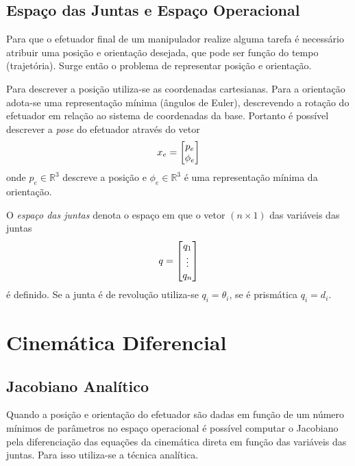 \subsection{Espaço das Juntas e Espaço Operacional}
Para que o efetuador final de um manipulador realize alguma tarefa é necessário atribuir uma posição e orientação desejada, que  pode ser função do tempo (trajetória). Surge então o problema de representar posição e orientação. 

Para descrever a posição utiliza-se as coordenadas cartesianas. Para a orientação adota-se uma representação mínima (ângulos de Euler), descrevendo a rotação do efetuador em relação ao sistema de coordenadas da base. Portanto é possível descrever a \textit{pose} do efetuador através do vetor
\begin{equation} \label{eq:op_space}
{x}_e = \begin{bmatrix} {p}_e \\ {\phi}_e\end{bmatrix}
\end{equation}
onde ${p}_e \in \mathbb{R}^3$ descreve a posição e ${\phi}_e \in \mathbb{R}^3$ é uma representação mínima da orientação.

O \textit{espaço das juntas} denota o espaço em que o vetor $(n \times 1)$ das variáveis das juntas
\begin{equation} \label{eq:joint_space}
{q} = \begin{bmatrix}q_1 \\ \vdots \\ q_n\end{bmatrix}
\end{equation} 
é definido. Se a junta é de revolução utiliza-se $q_i = \theta_i$, se é prismática $q_i = d_i$.

\section{Cinemática Diferencial}

\subsection{Jacobiano Analítico}
Quando a posição e orientação do efetuador são dadas em função de um número mínimos de parâmetros no espaço operacional é possível computar o Jacobiano pela diferenciação das equações da cinemática direta em função das variáveis das juntas.
Para isso utiliza-se a técnica analítica.

